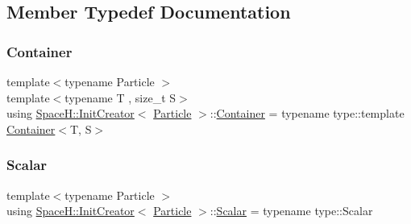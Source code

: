 \subsection{Member Typedef Documentation}
\mbox{\label{class_space_h_1_1_init_creator_a6e484fb8b2f46a2b1c4a54b782dec9d8}} 
\subsubsection{\texorpdfstring{Container}{Container}}
{\footnotesize\ttfamily template$<$typename Particle $>$ \\
template$<$typename T , size\+\_\+t S$>$ \\
using \mbox{\hyperlink{class_space_h_1_1_init_creator}{Space\+H\+::\+Init\+Creator}}$<$ \mbox{\hyperlink{struct_space_h_1_1_particle}{Particle}} $>$\+::\mbox{\hyperlink{class_space_h_1_1_init_creator_a6e484fb8b2f46a2b1c4a54b782dec9d8}{Container}} =  typename type\+::template \mbox{\hyperlink{class_space_h_1_1_init_creator_a6e484fb8b2f46a2b1c4a54b782dec9d8}{Container}}$<$T, S$>$}

\mbox{\label{class_space_h_1_1_init_creator_ac049ccad04f7cd33cc95b17ad763a988}} 
\subsubsection{\texorpdfstring{Scalar}{Scalar}}
{\footnotesize\ttfamily template$<$typename Particle $>$ \\
using \mbox{\hyperlink{class_space_h_1_1_init_creator}{Space\+H\+::\+Init\+Creator}}$<$ \mbox{\hyperlink{struct_space_h_1_1_particle}{Particle}} $>$\+::\mbox{\hyperlink{class_space_h_1_1_init_creator_ac049ccad04f7cd33cc95b17ad763a988}{Scalar}} =  typename type\+::\+Scalar}

\mbox{\label{class_space_h_1_1_init_creator_abe67b1be453e00e5ce5d84fe0755cf24}} 
